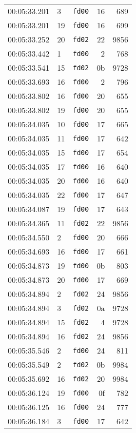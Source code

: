 \documentclass{article}
\begin{document}
\begin{longtable}{lllrr}
00:05:33.201 & 3 & \texttt{fd00} & 16 & 689 \\
00:05:33.201 & 19 & \texttt{fd00} & 16 & 699 \\
00:05:33.252 & 20 & \texttt{fd02} & 22 & 9856 \\
00:05:33.442 & 1 & \texttt{fd00} & 2 & 768 \\
00:05:33.541 & 15 & \texttt{fd02} & 0b & 9728 \\
00:05:33.693 & 16 & \texttt{fd00} & 2 & 796 \\
00:05:33.802 & 16 & \texttt{fd00} & 20 & 655 \\
00:05:33.802 & 19 & \texttt{fd00} & 20 & 655 \\
00:05:34.035 & 10 & \texttt{fd00} & 17 & 665 \\
00:05:34.035 & 11 & \texttt{fd00} & 17 & 642 \\
00:05:34.035 & 15 & \texttt{fd00} & 17 & 654 \\
00:05:34.035 & 17 & \texttt{fd00} & 16 & 640 \\
00:05:34.035 & 20 & \texttt{fd00} & 16 & 640 \\
00:05:34.035 & 22 & \texttt{fd00} & 17 & 647 \\
00:05:34.087 & 19 & \texttt{fd00} & 17 & 643 \\
00:05:34.365 & 11 & \texttt{fd02} & 22 & 9856 \\
00:05:34.550 & 2 & \texttt{fd00} & 20 & 666 \\
00:05:34.693 & 16 & \texttt{fd00} & 17 & 661 \\
00:05:34.873 & 19 & \texttt{fd00} & 0b & 803 \\
00:05:34.873 & 20 & \texttt{fd00} & 17 & 669 \\
00:05:34.894 & 2 & \texttt{fd02} & 24 & 9856 \\
00:05:34.894 & 3 & \texttt{fd02} & 0a & 9728 \\
00:05:34.894 & 15 & \texttt{fd02} & 4 & 9728 \\
00:05:34.894 & 16 & \texttt{fd02} & 24 & 9856 \\
00:05:35.546 & 2 & \texttt{fd00} & 24 & 811 \\
00:05:35.549 & 2 & \texttt{fd02} & 0b & 9984 \\
00:05:35.692 & 16 & \texttt{fd02} & 20 & 9984 \\
00:05:36.124 & 19 & \texttt{fd00} & 0f & 782 \\
00:05:36.125 & 16 & \texttt{fd00} & 24 & 777 \\
00:05:36.184 & 3 & \texttt{fd00} & 17 & 642 \\

\end{longtable}
\end{document}
